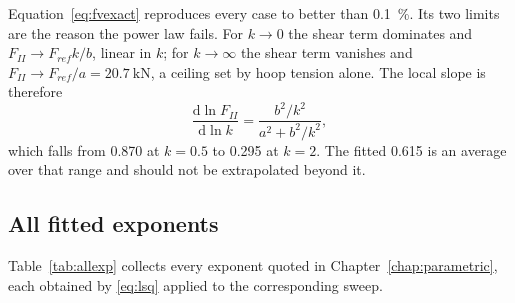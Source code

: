 Equation~\eqref{eq:fvexact} reproduces every case to better than
\SI{0.1}{\percent}. Its two limits are the reason the power law fails. For
$k \to 0$ the shear term dominates and $F_{II} \to F_{ref} k / b$, linear
in $k$; for $k \to \infty$ the shear term vanishes and
$F_{II} \to F_{ref}/a = \SI{20.7}{\kilo\newton}$, a ceiling set by hoop
tension alone. The local slope is therefore
\begin{equation}
\frac{\mathrm{d}\ln F_{II}}{\mathrm{d}\ln k}
  = \frac{b^2/k^2}{a^2 + b^2/k^2},
\end{equation}
which falls from \num{0.870} at $k = 0.5$ to \num{0.295} at $k = 2$. The
fitted \num{0.615} is an average over that range and should not be
extrapolated beyond it.

\subsection*{All fitted exponents}

Table~\ref{tab:allexp} collects every exponent quoted in
Chapter~\ref{chap:parametric}, each obtained by \eqref{eq:lsq} applied to
the corresponding sweep.

